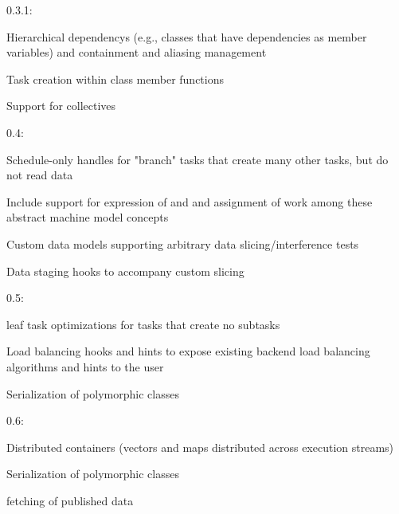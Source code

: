 \begin{compactdesc}
\item[0.3.1:]
\begin{compactitem}
\item Hierarchical \glspl{dependency} (e.g., classes that have dependencies as
member variables) and containment and aliasing management
\item Task creation within class member functions
\item Support for collectives
\end{compactitem}
\item[0.4:]
\begin{compactitem}
\item Schedule-only \glspl{handle} for "branch" \glspl{task} that create many other
  \glspl{task}, but do not read data
\item Include support for expression of  and
 and assignment of work among these abstract machine
model concepts
\item Custom data models supporting arbitrary data slicing/interference tests
\item Data staging hooks to accompany custom slicing
\end{compactitem}
\item[0.5:]
\begin{compactitem}
\item \Gls{leaf task} optimizations for \glspl{task} that create no
  \glspl{subtask}
\item Load balancing hooks and hints to expose existing backend load balancing algorithms and hints to the user
\item Serialization of polymorphic classes
\end{compactitem}
\item[0.6:]
\begin{compactitem}
\item Distributed containers (vectors and maps distributed across execution streams)
\item Serialization of polymorphic classes
\item {} \gls{fetch}ing of published data
\end{compactitem}
\end{compactdesc}
